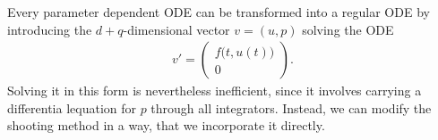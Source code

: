 


\begin{remark}
  Every parameter dependent ODE can be transformed into a regular ODE
  by introducing the ${d+q}$-dimensional vector $v=(u,p)$ solving the
  ODE
  \begin{gather*}
    v' =
    \begin{pmatrix}
      f\bigl(t,u(t)\bigr)\\0
    \end{pmatrix}.
  \end{gather*}
  Solving it in this form is nevertheless inefficient, since it
  involves carrying a differentia lequation for $p$ through all
  integrators. Instead, we can modify the shooting method in a way,
  that we incorporate it directly.
\end{remark}



